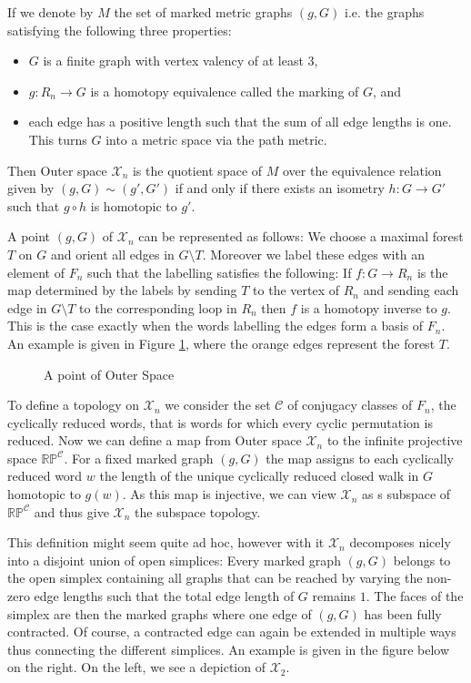 If we denote by $M$ the set of marked metric graphs $(g,G)$ i.e. the graphs satisfying the following three properties:
\begin{itemize}
	\item $G$ is a finite graph with vertex valency of at least $3$,
	\item $g: R_{n} \to G$ is a homotopy equivalence called the marking of $G$, and
	\item each edge has a positive length such that the sum of all
		edge lengths is one. This turns $G$ into a metric space via the path metric.
\end{itemize}
Then Outer space $\mathcal{X}_{n}$ is the quotient space of $M$ over the equivalence relation given by $(g,G) \sim (g',G')$ if and only if 
there exists an isometry $h: G \to G'$ such that $g \circ h$ is homotopic to $g'$.

A point $(g,G)$ of $\mathcal{X}_{n}$ can be represented as follows:
We choose a maximal forest $T$ on $G$ and orient all edges in $G \setminus T$.
Moreover we label these edges with an element of $F_{n}$ such that the labelling satisfies the following:
If $f: G \to R_{n}$ is the map determined by the labels by sending $T$ to the vertex of $R_{n}$ and sending
each edge in $G \setminus T$ to the corresponding loop in $R_{n}$ then $f$ is a homotopy inverse to $g$.
This is the case exactly when the words labelling the edges form a basis of $F_{n}$.
An example is given in Figure \ref{fig:pointOfXn}, where the orange edges represent the forest $T$.

\begin{figure}[ht]
	\centering
	\caption[skip=0pt]{A point of Outer Space}
	\label{fig:pointOfXn}
\end{figure}

To define a topology on $\mathcal{X}_{n}$ we consider the set $\mathcal{C}$ of conjugacy classes of $F_{n}$, the cyclically reduced words,
that is words for which every cyclic permutation is reduced.
Now we can define a map from Outer space $\mathcal{X}_{n}$ to the infinite projective space $\mathbb{RP}^{\mathcal{C}}$.
For a fixed marked graph $(g,G)$ the map assigns to each cyclically reduced word $w$ the length
of the unique cyclically reduced closed walk in $G$ homotopic to $g(w)$.
As this map is injective, we can view $\mathcal{X}_{n}$ as s subspace of $\mathbb{RP}^{\mathcal{C}}$ and thus
give $\mathcal{X}_{n}$ the subspace topology.

This definition might seem quite ad hoc, however with it $\mathcal{X}_{n}$ decomposes nicely into
a disjoint union of open simplices: Every marked graph $(g,G)$ belongs to the open simplex
containing all graphs that can be reached by varying the non-zero edge lengths such that
the total edge length of $G$ remains $1$. The faces of the simplex are then the marked graphs where one edge of $(g,G)$
has been fully contracted. Of course, a contracted edge can again be extended in multiple ways thus connecting
the different simplices. An example is given in the figure below on the right.
On the left, we see a depiction of $\mathcal{X}_{2}$.

